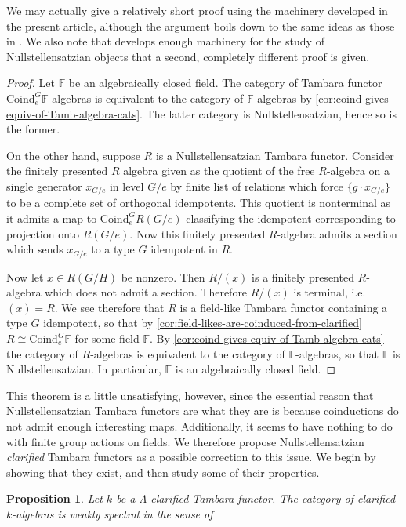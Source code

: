 \documentclass[11pt,dvipsnames]{amsart}
\newcommand{\F}{\mathbb{F}}
\newtheorem{proposition}[theorem]{Proposition}
\theoremstyle{BoldRemark}
\begin{document}
We may actually give a relatively short proof using the machinery developed in the present article, although the argument boils down to the same ideas as those in \cite{SSW24}. We also note that \cite{SSW24} develops enough machinery for the study of Nullstellensatzian objects that a second, completely different proof is given.

\begin{proof}
	Let $\F$ be an algebraically closed field. The category of Tambara functor $\mathrm{Coind}_e^G \F$-algebras is equivalent to the category of $\F$-algebras by \cref{cor:coind-gives-equiv-of-Tamb-algebra-cats}. The latter category is Nullstellensatzian, hence so is the former.
	
	On the other hand, suppose $R$ is a Nullstellensatzian Tambara functor. Consider the finitely presented $R$ algebra given as the quotient of the free $R$-algebra on a single generator $x_{G/e}$ in level $G/e$ by finite list of relations which force $\{ g \cdot x_{G/e} \}$ to be a complete set of orthogonal idempotents. This quotient is nonterminal as it admits a map to $\mathrm{Coind}_e^G R(G/e)$ classifying the idempotent corresponding to projection onto $R(G/e)$. Now this finitely presented $R$-algebra admits a section which sends $x_{G/e}$ to a type $G$ idempotent in $R$.
	
	Now let $x \in R(G/H)$ be nonzero. Then $R/(x)$ is a finitely presented $R$-algebra which does not admit a section. Therefore $R/(x)$ is terminal, i.e. $(x) = R$. We see therefore that $R$ is a field-like Tambara functor containing a type $G$ idempotent, so that by \cref{cor:field-likes-are-coinduced-from-clarified} $R \cong \mathrm{Coind}_e^G \F$ for some field $\F$. By \cref{cor:coind-gives-equiv-of-Tamb-algebra-cats} the category of $R$-algebras is equivalent to the category of $\F$-algebras, so that $\F$ is Nullstellensatzian. In particular, $\F$ is an algebraically closed field.
\end{proof}

This theorem is a little unsatisfying, however, since the essential reason that Nullstellensatzian Tambara functors are what they are is because coinductions do not admit enough interesting maps. Additionally, it seems to have nothing to do with finite group actions on fields. We therefore propose Nullstellensatzian \emph{clarified} Tambara functors as a possible correction to this issue. We begin by showing that they exist, and then study some of their properties.

\begin{proposition}
	Let $k$ be a $\Lambda$-clarified Tambara functor. The category of clarified $k$-algebras is weakly spectral in the sense of \cite[Definition A.1]{BSY22}
\end{proposition}
\end{document}

